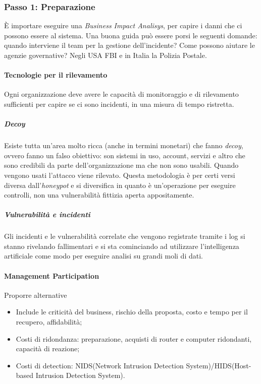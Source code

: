 \subsubsection{Passo 1: Preparazione}

È importare eseguire una \textit{Business Impact Analisys}, per capire i danni
che ci possono essere al sistema.
Una buona guida può essere porsi le seguenti domande: quando interviene il team
per la gestione dell'incidente? Come possono aiutare le agenzie governative?
Negli USA FBI e in Italia la Polizia Postale.

\paragraph{Tecnologie per il rilevamento}

Ogni organizzazione deve avere le capacità di monitoraggio e di rilevamento
sufficienti per capire se ci sono incidenti, in una misura di tempo ristretta.

\subparagraph*{Decoy} Esiste tutta un'area molto ricca (anche in termini
monetari) che fanno \textit{decoy}, ovvero fanno un falso obiettivo: son sistemi
in uso, account, servizi e altro che sono credibili da parte dell'organizzazione
ma che non sono usabili. Quando vengono usati l'attacco viene rilevato. Questa
metodologia è per certi versi diversa dall'\textit{honeypot} e si diversifica
in quanto è un'operazione per eseguire controlli, non una vulnerabilità fittizia
aperta appositamente.

\subparagraph*{Vulnerabilità e incidenti} Gli incidenti e le vulnerabilità
correlate che vengono registrate tramite i log si stanno rivelando fallimentari
e si sta cominciando ad utilizzare l'intelligenza artificiale come modo per eseguire
analisi su grandi moli di dati.

\paragraph*{Management Participation}

Proporre alternative
\begin{itemize}
\item Include le criticità del business, rischio della proposta, costo e tempo
per il recupero, affidabilità;
\item Costi di ridondanza: preparazione, acquisti di router e computer ridondanti,
capacità di reazione;
\item Costi di detection: NIDS(Network Intrusion Detection System)/HIDS(Host-based
Intrusion Detection System).
\end{itemize}

